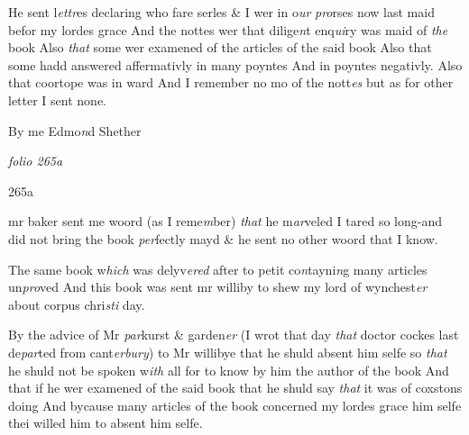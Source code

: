 \documentclass[12pt, a4paper]{book}
\begin{document}
				\marginpar[\vspace{0.5cm}{\textcolor{Gray}{33 34}}]{}
			
		\ifthenelse{\isodd{\thepage}}
		{\reversemarginpar}
		{\normalmarginpar}
		He sent l\textit{ettr}es declaring who fare serles \& I wer in o\textit{ur}
               \textit{pro}rses now
last maid befor my lordes grace  And the nottes wer that dilige\textit{n}t
enq\textit{ui}ry was maid of \textit{the} book Also \textit{that} some wer examened of the
articles of the said book Also that some hadd answered affermativly in many poyntes And in poyntes negativly. Also 
that coortope was in ward And I remember no mo of the nott\textit{es}
but as for other letter I sent none.


		\ifthenelse{\isodd{\thepage}}
		{\reversemarginpar}
		{\normalmarginpar}
		By me Edmo\textit{n}d Shether

\dotfill
						\newpage
{}

\textit{folio 265a}


\begin{flushright}{\color{Gray}265a}\end{flushright}

				\marginpar[\vspace{0.5cm}{\textcolor{Gray}{13}}]{}
			

		\ifthenelse{\isodd{\thepage}}
		{\reversemarginpar}
		{\normalmarginpar}
		mr baker sent me woord (as I reme\textit{m}ber) \textit{that }he m\textit{ar}veled I tared so long-and did not bring the book \textit{per}fectly mayd \& he sent no other woord
that I know.
         	
				\marginpar[\vspace{0.5cm}{\textcolor{Gray}{14}}]{}
			

		\ifthenelse{\isodd{\thepage}}
		{\reversemarginpar}
		{\normalmarginpar}
		The same book w\textit{hich} was delyv\textit{ered} after to petit co\textit{n}tayni\textit{n}g many articles
un\textit{pro}ved And this book was sent mr williby to shew my lord of
wynchest\textit{er }about corpus chri\textit{sti} day.
      	
				\marginpar[\vspace{0.5cm}{\textcolor{Gray}{15}}]{}
			

		\ifthenelse{\isodd{\thepage}}
		{\reversemarginpar}
		{\normalmarginpar}
		By the advice of Mr \textit{par}kurst \& garden\textit{er} (I wrot that day \textit{that }doctor
cockes last de\textit{par}ted from cant\textit{erbury}) to Mr willibye that he shuld
absent him selfe so \textit{that} he shuld not be spoken w\textit{ith} all for to know by
him the author of the book And that if he wer examened of the
said book that he shuld say \textit{that} it was of coxstons doing And
bycause many articles of the book concerned my lordes grace 
him selfe thei willed him to absent him selfe.
         	
\end{document}

